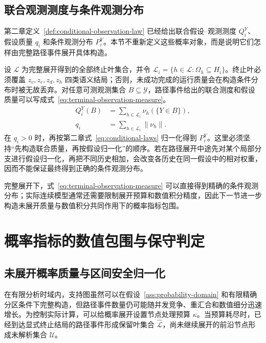 \documentclass[master,fontset=ubuntu]{shnuthesis}
\theoremstyle{definition}
\begin{document}
\subsection{联合观测测度与条件观测分布}

第二章定义~\ref{def:conditional-observation-law} 已经给出联合假设--观测测度 \(Q_i^Y\)、假设质量 \(q_i\) 和条件观测分布 \(P_i^Y\)。本节不重新定义这些概率对象，而是说明它们怎样由完整路径事件展开具体构造。

设 \(\mathcal L\) 为完整展开得到的全部终止叶集合，并令 \(\mathcal L_i=\{h\in\mathcal L:\Omega_h\subseteq H_i\}\)。终止叶必须覆盖 \(z_c,z_e,z_d,z_h\) 四类语义结局；否则，未成功完成的运行质量会在构造条件分布时被无故丢弃。对任意可测观测集合 \(B\subseteq\mathcal Y\)，路径事件给出的联合测度和假设质量可以写成式~\eqref{eq:terminal-observation-measure}。
\begin{equation}
\begin{aligned}
Q_i^Y(B)
&=
\sum_{h\in\mathcal L_i}
\nu_h\!\left(\{Y\in B\}\right),\\
q_i
&=
\sum_{h\in\mathcal L_i}\|\nu_h\|.
\end{aligned}
\label{eq:terminal-observation-measure}
\end{equation}
在 \(q_i>0\) 时，再按第二章式~\eqref{eq:conditional-laws} 归一化得到 \(P_i^Y\)。这里必须坚持“先构造联合质量，再按假设归一化”的顺序。若在路径展开中途先对某个局部分支进行假设归一化，再把不同历史相加，会改变各历史在同一假设中的相对权重，因而不能保证最终得到正确的条件观测分布。

完整展开下，式~\eqref{eq:terminal-observation-measure} 可以直接得到精确的条件观测分布；实际连续模型通常还需要限制展开预算和数值积分精度，因此下一节进一步构造未展开质量与数值积分共同作用下的概率指标包围。

\section{概率指标的数值包围与保守判定}

\subsection{未展开概率质量与区间安全归一化}

在有限分析时域内，支持图虽然可以在假设~\ref{ass:probability-domain} 和有限精确分区条件下完整构造，但路径事件数量仍可能随并发竞争、重汇合和数值细分迅速增长。为控制实际计算，可以给概率展开设置节点处理预算 \(\kappa\)。当预算耗尽时，已经到达显式终止结局的路径事件形成保留叶集合 \(\widehat{\mathcal L}\)，尚未继续展开的前沿节点形成未解析集合 \(\mathcal U\)。
\end{document}
